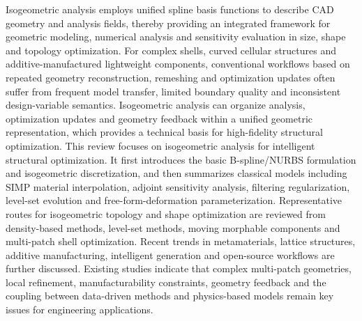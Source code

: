 Isogeometric analysis employs unified spline basis functions to describe CAD geometry and analysis fields, thereby providing an integrated framework for geometric modeling, numerical analysis and sensitivity evaluation in size, shape and topology optimization. For complex shells, curved cellular structures and additive-manufactured lightweight components, conventional workflows based on repeated geometry reconstruction, remeshing and optimization updates often suffer from frequent model transfer, limited boundary quality and inconsistent design-variable semantics. Isogeometric analysis can organize analysis, optimization updates and geometry feedback within a unified geometric representation, which provides a technical basis for high-fidelity structural optimization. This review focuses on isogeometric analysis for intelligent structural optimization. It first introduces the basic B-spline/NURBS formulation and isogeometric discretization, and then summarizes classical models including SIMP material interpolation, adjoint sensitivity analysis, filtering regularization, level-set evolution and free-form-deformation parameterization. Representative routes for isogeometric topology and shape optimization are reviewed from density-based methods, level-set methods, moving morphable components and multi-patch shell optimization. Recent trends in metamaterials, lattice structures, additive manufacturing, intelligent generation and open-source workflows are further discussed. Existing studies indicate that complex multi-patch geometries, local refinement, manufacturability constraints, geometry feedback and the coupling between data-driven methods and physics-based models remain key issues for engineering applications.
